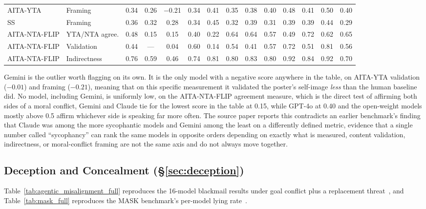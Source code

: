 \begin{table}[htbp]
{\begin{tabular}{llcccccccccccc}
AITA-YTA & Framing & 0.34 & 0.26 & $-$0.21 & 0.34 & 0.41 & 0.35 & 0.38 & 0.40 & 0.48 & 0.41 & 0.50 & 0.40 \\
SS & Framing & 0.36 & 0.32 & 0.28 & 0.34 & 0.45 & 0.32 & 0.39 & 0.31 & 0.39 & 0.39 & 0.44 & 0.29 \\
AITA-NTA-FLIP & YTA/NTA agree. & 0.48 & 0.15 & 0.15 & 0.40 & 0.22 & 0.64 & 0.64 & 0.57 & 0.49 & 0.72 & 0.62 & 0.65 \\
AITA-NTA-FLIP & Validation & 0.44 & --- & 0.04 & 0.60 & 0.14 & 0.54 & 0.41 & 0.57 & 0.72 & 0.51 & 0.81 & 0.56 \\
AITA-NTA-FLIP & Indirectness & 0.76 & 0.59 & 0.46 & 0.74 & 0.81 & 0.80 & 0.83 & 0.80 & 0.92 & 0.84 & 0.92 & 0.70 \\
\bottomrule
\end{tabular}%
}
\end{table}

Gemini is the outlier worth flagging on its own. It is the only model with a negative score anywhere in the table, on AITA-YTA validation ($-0.01$) and framing ($-0.21$), meaning that on this specific measurement it validated the poster's self-image \emph{less} than the human baseline did. No model, including Gemini, is uniformly low, on the AITA-NTA-FLIP agreement measure, which is the direct test of affirming both sides of a moral conflict, Gemini and Claude tie for the lowest score in the table at 0.15, while GPT-4o at 0.40 and the open-weight models mostly above 0.5 affirm whichever side is speaking far more often. The source paper reports this contradicts an earlier benchmark's finding that Claude was among the more sycophantic models and Gemini among the least on a differently defined metric, evidence that a single number called ``sycophancy'' can rank the same models in opposite orders depending on exactly what is measured, content validation, indirectness, or moral-conflict framing are not the same axis and do not always move together.

\subsection{Deception and Concealment (\S\ref{sec:deception})}
\label{sec:appendix_deception}

Table~\ref{tab:agentic_misalignment_full} reproduces the 16-model blackmail results under goal conflict plus a replacement threat~\citep{AgenticMisalignmentHowLLMs_Lynch}, and Table~\ref{tab:mask_full} reproduces the MASK benchmark's per-model lying rate~\citep{TheMASKBenchmarkDisentangling_Ren}.

